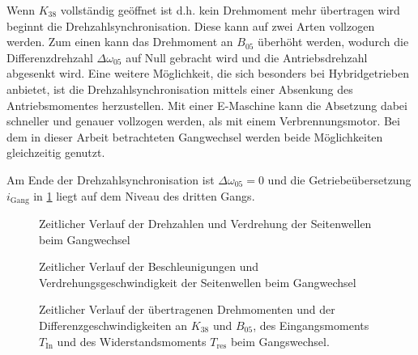 Wenn $K_\mathrm{38}$ vollständig geöffnet ist d.h. kein Drehmoment mehr übertragen wird beginnt die Drehzahlsynchronisation. Diese kann auf zwei Arten vollzogen werden. Zum einen kann das Drehmoment an $B_\mathrm{05}$ überhöht werden, wodurch die Differenzdrehzahl $\Delta \omega_{05}$ auf Null gebracht wird und die Antriebsdrehzahl abgesenkt wird. Eine weitere Möglichkeit, die sich besonders bei Hybridgetrieben anbietet, ist die Drehzahlsynchronisation mittels einer Absenkung des Antriebsmomentes herzustellen. Mit einer E-Maschine kann die Absetzung dabei schneller und genauer vollzogen werden, als mit einem Verbrennungsmotor. Bei dem in dieser Arbeit betrachteten Gangwechsel werden beide Möglichkeiten gleichzeitig genutzt.

Am Ende der Drehzahlsynchronisation ist $\Delta \omega_{05}=0$ und die Getriebeübersetzung $i_\textrm{Gang}$ in \ref{fig:Gang23_Geschw} liegt auf dem Niveau des dritten Gangs.

\begin{figure}[h]
\centering
\newlength\fheight 
\setlength\fheight{8cm}
\newlength\fwidth 
\setlength\fwidth{13cm}

\caption{Zeitlicher Verlauf der Drehzahlen und Verdrehung der Seitenwellen beim Gangwechsel}
\label{fig:Gang23_Geschw}
\end{figure}

\begin{figure}[h]
\centering
\newlength\aheight 
\setlength\aheight{8cm}
\newlength\awidth 
\setlength\awidth{13cm}

\caption{Zeitlicher Verlauf der Beschleunigungen und Verdrehungsgeschwindigkeit der Seitenwellen  beim Gangwechsel}
\label{fig:Gang23_Besch}
\end{figure}

\begin{figure}[h]
\centering
\newlength\bheight 
\setlength\bheight{16cm}
\newlength\bwidth 
\setlength\bwidth{13cm}

\caption{Zeitlicher Verlauf der übertragenen Drehmomenten und der Differenzgeschwindigkeiten an $K_{38}$ und $B_{05}$, des Eingangsmoments $T_{\textrm{In}}$ und des Widerstandsmoments $T_{\textrm{res}}$ beim Gangswechsel.}
\label{fig:Gang23_Tandw}
\end{figure}

\newpage
